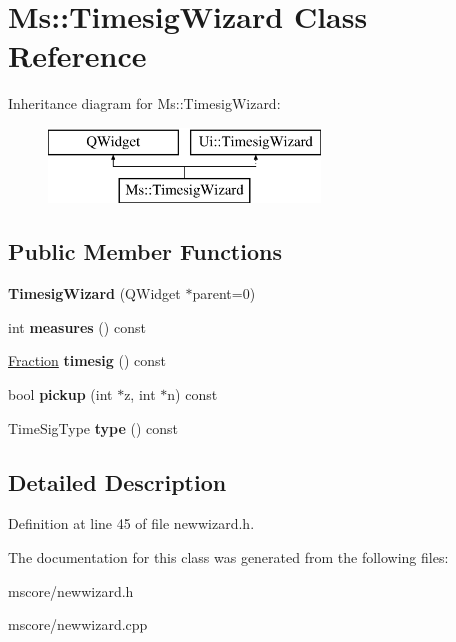 \hypertarget{class_ms_1_1_timesig_wizard}{}\section{Ms\+:\+:Timesig\+Wizard Class Reference}
\label{class_ms_1_1_timesig_wizard}
Inheritance diagram for Ms\+:\+:Timesig\+Wizard\+:\begin{figure}[H]
\begin{center}
\leavevmode
\includegraphics[height=2.000000cm]{class_ms_1_1_timesig_wizard}
\end{center}
\end{figure}
\subsection*{Public Member Functions}
\begin{DoxyCompactItemize}
\item 
\mbox{\label{class_ms_1_1_timesig_wizard_a0c1abb06a32e417634d6753726f869ca}} 
{\bfseries Timesig\+Wizard} (Q\+Widget $\ast$parent=0)
\item 
\mbox{\label{class_ms_1_1_timesig_wizard_adff102fc1d77194e0ba42e590420a799}} 
int {\bfseries measures} () const
\item 
\mbox{\label{class_ms_1_1_timesig_wizard_a2953dbf2c66ccf0081e081cc41fd27e6}} 
\hyperlink{class_ms_1_1_fraction}{Fraction} {\bfseries timesig} () const
\item 
\mbox{\label{class_ms_1_1_timesig_wizard_a6e61c107cfa7b39d89fe29a2c4460dbc}} 
bool {\bfseries pickup} (int $\ast$z, int $\ast$n) const
\item 
\mbox{\label{class_ms_1_1_timesig_wizard_ae9e5396999660589e7b96aa5cd307445}} 
Time\+Sig\+Type {\bfseries type} () const
\end{DoxyCompactItemize}


\subsection{Detailed Description}


Definition at line 45 of file newwizard.\+h.



The documentation for this class was generated from the following files\+:\begin{DoxyCompactItemize}
\item 
mscore/newwizard.\+h\item 
mscore/newwizard.\+cpp\end{DoxyCompactItemize}
